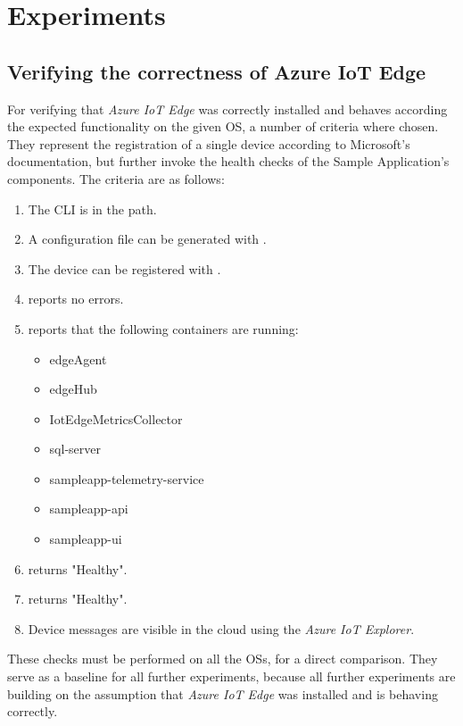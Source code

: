\section{Experiments}
\subsection{Verifying the correctness of Azure IoT Edge}
For verifying that \textit{Azure IoT Edge} was correctly installed
and behaves according the expected functionality on the given
\ac{OS}, a number of criteria where chosen. They represent the registration
of a single device according to Microsoft's documentation, but further
invoke the health checks of the Sample Application's components.
The criteria are as follows:

\begin{enumerate}
    \item The  \ac{CLI} is in the path.
    \item A configuration file can be generated with .
    \item The device can be registered with .
    \item {} reports no errors.
    \item {} reports that the following containers
    are running:
    \begin{itemize}
        \item edgeAgent
        \item edgeHub
        \item IotEdgeMetricsCollector
        \item sql-server
        \item sampleapp-telemetry-service
        \item sampleapp-api
        \item sampleapp-ui
    \end{itemize}
    \item {} returns "Healthy".
    \item {} returns "Healthy".
    \item Device messages are visible in the cloud using the \textit{Azure IoT Explorer}.
\end{enumerate}
These checks must be performed on all the \ac{OS}s, for a direct comparison.
They serve as a baseline for all further experiments, because all further
experiments are building on the assumption that \textit{Azure IoT Edge} was
installed and is behaving correctly.

